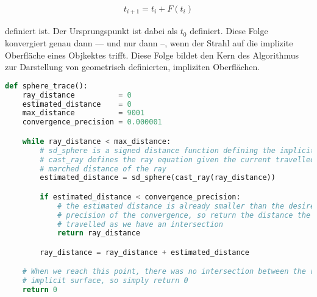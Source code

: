 \begin{gather}
    t_{i+1} = t_{i} + F(t_{i})
\end{gather}

definiert ist. Der Ursprungspunkt ist dabei als $t_{0}$ definiert. Diese Folge
konvergiert genau dann --- und nur dann --, wenn der Strahl auf die implizite
Oberfläche eines Objkektes trifft. Diese Folge bildet den Kern des Algorithmus
zur Darstellung von geometrisch definierten, impliziten Oberflächen.

\begin{lstlisting}[language=Python,caption={Eine abstrakte Umsetzung des Sphere
        Tracings\protect\footnotemark.},label={fig:sphere_tracing},captionpos=b,emph={sphere_trace}]
def sphere_trace():
    ray_distance          = 0
    estimated_distance    = 0
    max_distance          = 9001
    convergence_precision = 0.000001

    while ray_distance < max_distance:
        # sd_sphere is a signed distance function defining the implicit surface
        # cast_ray defines the ray equation given the current travelled /
        # marched distance of the ray
        estimated_distance = sd_sphere(cast_ray(ray_distance))

        if estimated_distance < convergence_precision:
            # the estimated distance is already smaller than the desired
            # precision of the convergence, so return the distance the ray has
            # travelled as we have an intersection
            return ray_distance

        ray_distance = ray_distance + estimated_distance

    # When we reach this point, there was no intersection between the ray and a
    # implicit surface, so simply return 0
    return 0
\end{lstlisting}
